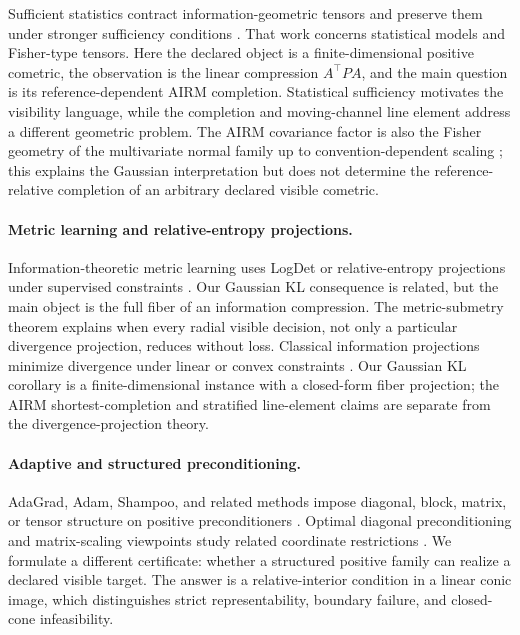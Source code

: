 Sufficient statistics contract information-geometric tensors and preserve
them under stronger sufficiency conditions \citep{ay2015sufficient}.  That
work concerns statistical models and Fisher-type tensors.  Here the declared
object is a finite-dimensional positive cometric, the observation is the
linear compression \(A^\top PA\), and the main question is its
reference-dependent AIRM completion.  Statistical sufficiency motivates the
visibility language, while the completion and moving-channel line element
address a different geometric problem.
The AIRM covariance factor is also the Fisher geometry of the multivariate
normal family up to convention-dependent scaling
\citep{lovric2000multivariate}; this explains the Gaussian interpretation but
does not determine the reference-relative completion of an arbitrary declared
visible cometric.

\paragraph{Metric learning and relative-entropy projections.}
Information-theoretic metric learning uses LogDet or relative-entropy
projections under supervised constraints \citep{davis2007information}.  Our
Gaussian KL consequence is related, but the main object is the full fiber of
an information compression.  The metric-submetry theorem explains when every
radial visible decision, not only a particular divergence projection, reduces
without loss.  Classical information projections minimize divergence under
linear or convex constraints
\citep{csiszar1975idivergence,csiszar2003projections}.  Our Gaussian KL
corollary is a finite-dimensional instance with a closed-form fiber
projection; the AIRM shortest-completion and stratified line-element claims
are separate from the divergence-projection theory.

\paragraph{Adaptive and structured preconditioning.}
AdaGrad, Adam, Shampoo, and related methods impose diagonal, block, matrix, or
tensor structure on positive preconditioners
\citep{duchi2011adagrad,kingma2014adam,gupta2018shampoo,morwani2024shampoo}.
Optimal diagonal preconditioning and matrix-scaling viewpoints study related
coordinate restrictions \citep{qu2025optimaldiagonal}.  We formulate a
different certificate: whether a structured positive family can realize a
declared visible target.  The answer is a relative-interior condition in a
linear conic image, which distinguishes strict representability, boundary
failure, and closed-cone infeasibility.

